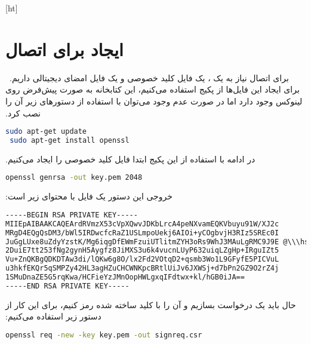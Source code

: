 ‫
‫[ht]
‫
‫
‫
‫
‫\section{ایجاد  برای اتصال }
‫برای اتصال  نیاز به یک ، یک فایل کلید خصوصی و یک فایل امضای دیجیتالی داریم.~ 
‫برای ایجاد این فایل‌ها از پکیج   استفاده می‌کنیم، این کتابخانه به صورت پیش‌فرض روی لینوکس وجود دارد اما در صورت عدم وجود می‌توان با استفاده از دستورهای زیر آن را نصب کرد.
‫
\begin{latin}
\begin{lstlisting}[language=bash]
 sudo apt-get update
 sudo apt-get install openssl
\end{lstlisting}
\end{latin}

‫در ادامه با استفاده از این پکیج ابتدا فایل کلید خصوصی را ایجاد می‌کنیم.
‫
\begin{latin}
\begin{lstlisting}[language=bash]
 openssl genrsa -out key.pem 2048
\end{lstlisting}
\end{latin}

‫خروجی این دستور یک فایل با محتوای زیر است:
‫
\begin{latin}
\begin{lstlisting}[language=bash]
-----BEGIN RSA PRIVATE KEY-----
MIIEpAIBAAKCAQEArdRVmzX53cVpXQwvJDKbLrcA4peNXvamEQKVbuyu91W/XJ2c
MRgD4EQgQsDM3/bWl5IRDwcfcRaZ1USLmpoUekj6AIOi+yCOgbvjH3RIz5SREc0I
JuGgLUxe8uZdyYzstK/Mg6iqgDfEWmFzuiUTlitmZYH3oRs9WhJ3MAuLgRMC9J9E @\\\hspace*{4em}\large\vdots \setcounter{lstnumber}{22}@
2DuiE7tt253fNg2gynH5Aygfz8JiMXS3u6k4vucnLUyP632uiqLZgHp+IRguIZt5
Vu+ZnQKBgQDKDTAw3di/lQKw6g8O/lx2Fd2VOtqD2+qsmb3Wo1L9GFyfE5PICVuL
u3hkfEKQr5qSMPZy42HL3agHZuCHCWNKpcBRtlUiJv6JXWSj+d7bPn2GZ9O2rZ4j
1SMuDnaZE5G5rqKwa/HCFieYzJMnOopHWLgxqIFdtwx+kl/hGB0iJA==
-----END RSA PRIVATE KEY-----

\end{lstlisting}
\end{latin}

‫حال باید یک درخواست  بسازیم و آن را با کلید ساخته شده رمز کنیم، برای این کار از دستور زیر استفاده می‌کنیم:
‫
\begin{latin}
\begin{lstlisting}[language=bash]
 openssl req -new -key key.pem -out signreq.csr
\end{lstlisting}
\end{latin}

